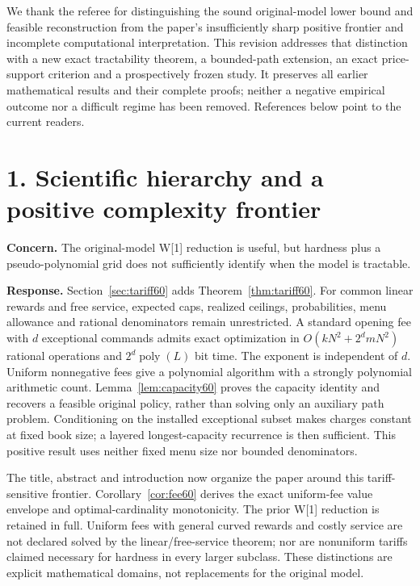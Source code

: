 We thank the referee for distinguishing the sound original-model lower bound and feasible reconstruction from the paper's insufficiently sharp positive frontier and incomplete computational interpretation. This revision addresses that distinction with a new exact tractability theorem, a bounded-path extension, an exact price-support criterion and a prospectively frozen study. It preserves all earlier mathematical results and their complete proofs; neither a negative empirical outcome nor a difficult regime has been removed. References below point to the current readers.

\section*{1. Scientific hierarchy and a positive complexity frontier}
\textbf{Concern.} The original-model W[1] reduction is useful, but hardness plus a pseudo-polynomial grid does not sufficiently identify when the model is tractable.

\textbf{Response.} Section~\ref{sec:tariff60} adds Theorem~\ref{thm:tariff60}. For common linear rewards and free service, expected caps, realized ceilings, probabilities, menu allowance and rational denominators remain unrestricted. A standard opening fee with $d$ exceptional commands admits exact optimization in $O(kN^2+2^d mN^2)$ rational operations and $2^d\operatorname{poly}(L)$ bit time. The exponent is independent of $d$. Uniform nonnegative fees give a polynomial algorithm with a strongly polynomial arithmetic count. Lemma~\ref{lem:capacity60} proves the capacity identity and recovers a feasible original policy, rather than solving only an auxiliary path problem. Conditioning on the installed exceptional subset makes charges constant at fixed book size; a layered longest-capacity recurrence is then sufficient. This positive result uses neither fixed menu size nor bounded denominators.

The title, abstract and introduction now organize the paper around this tariff-sensitive frontier. Corollary~\ref{cor:fee60} derives the exact uniform-fee value envelope and optimal-cardinality monotonicity. The prior W[1] reduction is retained in full. Uniform fees with general curved rewards and costly service are not declared solved by the linear/free-service theorem; nor are nonuniform tariffs claimed necessary for hardness in every larger subclass. These distinctions are explicit mathematical domains, not replacements for the original model.

